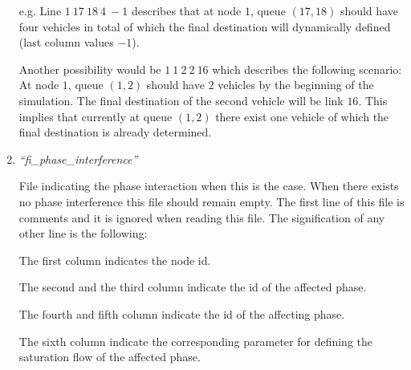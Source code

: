 \documentclass[10pt, conference, compsocconf]{IEEEtran}
\begin{document}
\begin{enumerate}
e.g. Line $1	\ 17	\ 18	\ 4	\ -1$	 describes that at node $1$, queue $(17,18)$ should have four vehicles in total of which the final destination will dynamically defined (last column values $-1$).

Another possibility would be $1\	1	\ 2	\ 2	\ 16 $ which describes the following scenario:
At node $1$, queue $(1,2)$ should have $2$ vehicles by the beginning of the simulation. The final destination of the second vehicle will be link $16$.
This implies that currently at queue $(1,2)$ there exist one vehicle of which the final destination is already determined. 



\item \emph{``fi\_phase\_interference''}

File indicating the phase interaction  when this is the case.
When  there exists no phase interference this file should remain empty.
The first line of this file is comments and it is ignored when reading this file. 
The signification of any other line is the following:


The first column indicates the node id. 

The second and the third column indicate the id of the affected phase.

The  fourth and fifth column indicate the id of the affecting phase. 

The sixth column indicate the corresponding parameter for defining the saturation flow of the affected phase. 
 
\end{enumerate}







\end{document}
